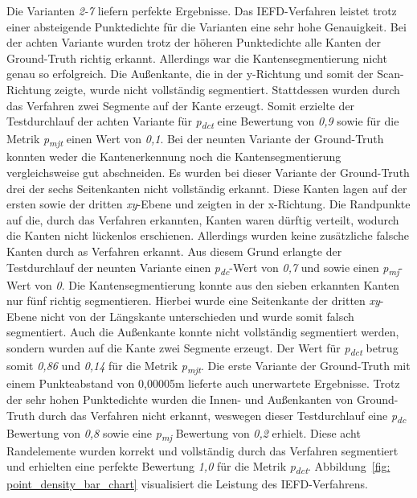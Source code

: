 Die Varianten \textit{2-7} liefern perfekte Ergebnisse. Das IEFD-Verfahren leistet trotz einer absteigende Punktedichte für die Varianten eine sehr hohe Genauigkeit. Bei der achten Variante wurden trotz der höheren Punktedichte alle Kanten der Ground-Truth richtig erkannt. Allerdings war die Kantensegmentierung nicht genau so erfolgreich. Die Außenkante, die in der y-Richtung und somit der Scan-Richtung zeigte, wurde nicht vollständig segmentiert. Stattdessen wurden durch das Verfahren zwei Segmente auf der Kante erzeugt. Somit erzielte der Testdurchlauf der achten Variante für \textit{p\textsubscript{dct}} eine Bewertung von \textit{0,9} sowie für die Metrik \textit{p\textsubscript{mjt}} einen Wert von \textit{0,1}. Bei der neunten Variante der Ground-Truth konnten weder die Kantenerkennung noch die Kantensegmentierung vergleichsweise gut abschneiden. Es wurden bei dieser Variante der Ground-Truth drei der sechs Seitenkanten nicht vollständig erkannt. Diese Kanten lagen auf der ersten sowie der dritten \textit{xy}-Ebene und zeigten in der x-Richtung. Die Randpunkte auf die, durch das Verfahren erkannten, Kanten waren dürftig verteilt, wodurch die Kanten nicht lückenlos erschienen. Allerdings wurden keine zusätzliche falsche Kanten durch as Verfahren erkannt. Aus diesem Grund erlangte der Testdurchlauf der neunten Variante einen \textit{p\textsubscript{dc}}-Wert von \textit{0,7} und sowie einen \textit{p\textsubscript{mj}}-Wert von \textit{0}. Die Kantensegmentierung konnte aus den sieben erkannten Kanten nur fünf richtig segmentieren. Hierbei wurde eine Seitenkante der dritten \textit{xy}-Ebene nicht von der Längskante unterschieden und wurde somit falsch segmentiert. Auch die Außenkante konnte nicht vollständig segmentiert werden, sondern wurden auf die Kante zwei Segmente erzeugt. Der Wert für \textit{p\textsubscript{dct}} betrug somit \textit{0,86} und \textit{0,14} für die Metrik \textit{p\textsubscript{mjt}}. Die erste Variante der Ground-Truth mit einem Punkteabstand von 0,00005m lieferte auch unerwartete Ergebnisse. Trotz der sehr hohen Punktedichte wurden die Innen- und Außenkanten von Ground-Truth durch das Verfahren nicht erkannt, weswegen dieser Testdurchlauf eine \textit{p\textsubscript{dc}} Bewertung von \textit{0,8} sowie eine \textit{p\textsubscript{mj}} Bewertung von \textit{0,2} erhielt. Diese acht Randelemente wurden korrekt und vollständig durch das Verfahren segmentiert und erhielten eine perfekte Bewertung \textit{1,0} für die Metrik \textit{p\textsubscript{dct}}. Abbildung~\ref{fig: point_density_bar_chart} visualisiert die Leistung des IEFD-Verfahrens.

